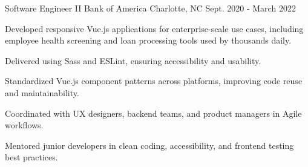 \begin{cventries}
\cventry
{Software Engineer II} %
{Bank of America} %
{Charlotte, NC} %
{Sept. 2020 - March 2022} %
{
  \begin{cvitems} %
    \item {Developed responsive Vue.js applications for enterprise-scale use cases, including employee health screening and loan processing tools used by thousands daily.}
    \item {Delivered  using Sass and ESLint, ensuring accessibility and usability.}
    \item {Standardized Vue.js component patterns across platforms, improving code reuse and maintainability.}
    \item {Coordinated with UX designers, backend teams, and product managers in Agile workflows.}
    \item {Mentored junior developers in clean coding, accessibility, and frontend testing best practices.}
  \end{cvitems}
}


\end{cventries}
